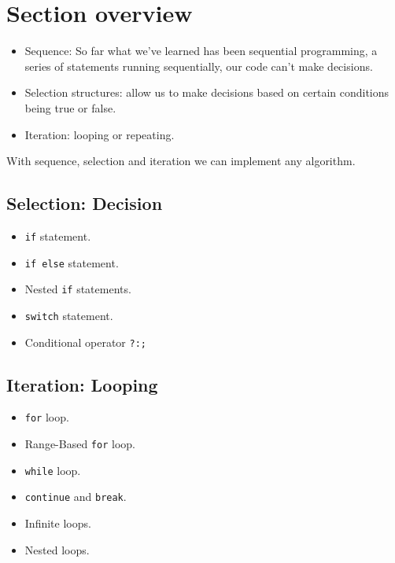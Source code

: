 \section{Section overview}
\begin{itemize}
    \item Sequence: So far what we've learned has been sequential programming, a series of statements running sequentially, our code can't make decisions.
    \item Selection structures: allow us to make decisions based on certain conditions being true or false.
    \item Iteration: looping or repeating.
\end{itemize}

With sequence, selection and iteration we can implement any algorithm.

\subsection{Selection: Decision}
\begin{itemize}
    \item \texttt{if} statement.
    \item \texttt{if else} statement.
    \item Nested \texttt{if} statements.
    \item \texttt{switch} statement.
    \item Conditional operator \texttt{?:;}
\end{itemize}

\subsection{Iteration: Looping}
\begin{itemize}
    \item \texttt{for} loop.
    \item Range-Based \texttt{for} loop.
    \item \texttt{while} loop.
    \item \texttt{continue} and \texttt{break}.
    \item Infinite loops.
    \item Nested loops.
\end{itemize}


